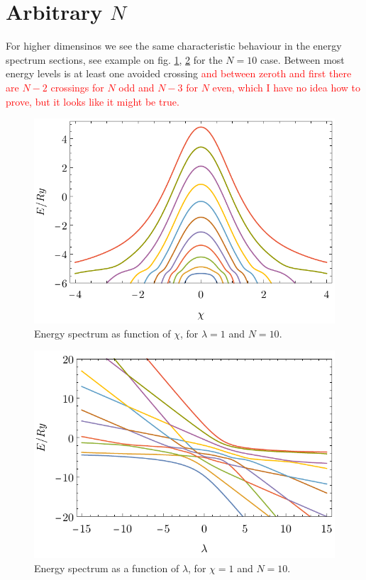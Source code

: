 \section{Arbitrary $N$}
For higher dimensinos we see the same characteristic behaviour in the energy spectrum sections, see example on fig. \ref{fig:N=10_energiesl}, \ref{fig:N=10_energies2} for the $N=10$ case. Between most energy levels is at least one avoided crossing \textcolor{red}{and between zeroth and first there are $N-2$ crossings for $N$ odd and $N-3$ for $N$ even, which I have no idea how to prove, but it looks like it might be true.}


\begin{figure}[H]
    \centering
    \includegraphics{../img/N=10_energiesl.pdf}
    \caption{Energy spectrum as function of $\chi$, for $\lambda=1$ and $N=10$.}
    \label{fig:N=10_energiesl}    
\end{figure}
\begin{figure}[H]
    \centering
    \includegraphics{../img/N=10_energies2.pdf}
    \caption{Energy spectrum as a function of $\lambda$, for $\chi=1$ and $N=10$.}
    \label{fig:N=10_energies2}    
\end{figure}

